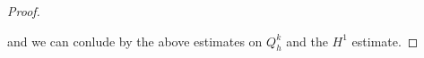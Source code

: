 \documentclass[english,a4paper,9pt,oneside]{scrbook}	%
\theoremstyle{break}
\newtheorem{thm}[equation]{Theorem}
\newenvironment{mproof}[1][\proofname]{%
  \begin{proof}[#1]$ $\par\nobreak\ignorespaces
}{%
  \end{proof}
}
\renewcommand*{\proofname}{Proof}
\theoremstyle{remark}
\newcommand{\ds}{\displaystyle}
\newcommand{\norm}[1]{\left\lVert#1\right\rVert}
\begin{document}
\begin{appendices}
\begin{mproof}
and we can conlude by the above estimates on $Q_h^k$ and the $H^1$ estimate.
\end{mproof}

%
%
%
%
%
%
%
%
%
%
%


\end{appendices}
\end{document}
